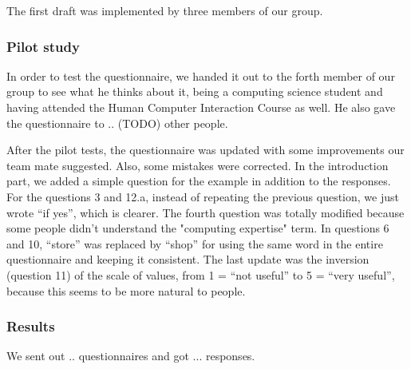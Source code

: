 The first draft was implemented by three members of our group.

\subsubsection{Pilot study}
In order to test the questionnaire, we handed it out to the forth member of our group to see what he thinks about it, being a computing science student and having attended the Human Computer Interaction Course as well. He also gave the questionnaire to .. (TODO) other people.

After the pilot tests, the questionnaire was updated with some improvements our team mate suggested. Also, some mistakes were corrected. In the introduction part, we added a simple question for the example in addition to the responses. For the questions 3 and 12.a, instead of repeating the previous question, we just wrote “if yes”, which is clearer. The fourth question was totally modified because some people didn’t understand the "computing expertise" term. In questions 6 and 10, “store” was replaced by “shop” for using the same word in the entire questionnaire and keeping it consistent. The last update was the inversion (question 11) of the scale of values, from 1 = “not useful” to 5 = “very useful”, because this seems to be more natural to people.

\subsubsection{Results}
We sent out .. questionnaires and got ... responses.
